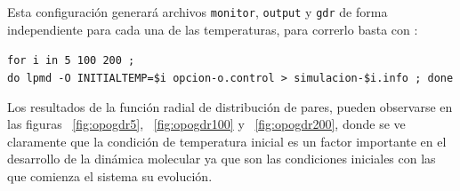 Esta configuraci\'on generar\'a archivos \verb|monitor|, \verb|output| y \verb|gdr| de forma independiente para cada una de las temperaturas, para correrlo basta con :

\begin{center}
 \texttt{for i in 5 100 200 ; \\do lpmd -O INITIALTEMP=\$i opcion-o.control > simulacion-\$i.info ; done}
\end{center}

Los resultados de la funci\'on radial de distribuci\'on de pares, pueden observarse en las figuras ~\ref{fig:opogdr5}, ~\ref{fig:opogdr100} y ~\ref{fig:opogdr200}, donde se ve claramente que la condici\'on de temperatura inicial es un factor importante en el desarrollo de la din\'amica molecular ya que son las condiciones iniciales con las que comienza el sistema su evoluci\'on.

